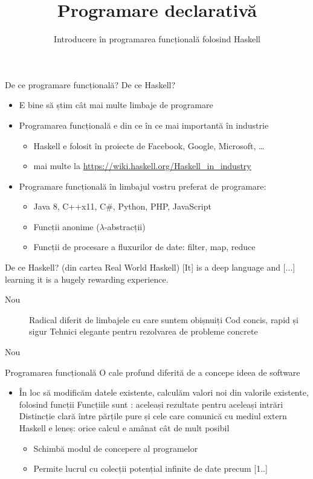 \documentclass[handout,xcolor=pdftex,romanian,colorlinks]{beamer}
\title[PD---Introducere]{Programare declarativă}
\subtitle{Introducere în programarea funcțională folosind Haskell}
\begin{document}
\begin{frame}
  \titlepage
\end{frame}

\begin{frame}{De ce programare funcțională? De ce Haskell?}
\begin{itemize}
\item E bine să știm cât mai multe limbaje de programare
\item Programarea funcțională e din ce în ce mai importantă în industrie
\begin{itemize}
\item Haskell e folosit în proiecte de Facebook, Google, Microsoft, \ldots
\item mai multe la \url{https://wiki.haskell.org/Haskell_in_industry}
\end{itemize} 
\item Programare funcțională în limbajul vostru preferat de programare:

\begin{itemize}
\item  Java 8, C++x11, C\#, Python, PHP, JavaScript 
\item Funcții anonime ($\lambda$-abstracții)
\item Funcții de procesare a fluxurilor de date: filter, map, reduce
\end{itemize}
\end{itemize}

\begin{block}{De ce Haskell? (din cartea Real World Haskell)}
 [It] is a deep language and [...] learning it is a hugely rewarding experience.
\end{block}
\begin{description}
\item[Nou] Radical diferit de limbajele cu care suntem obișnuiți
\vitem[Puternic] Cod concis, rapid și sigur
\vitem[Plăcut] Tehnici elegante pentru rezolvarea de probleme concrete
\end{description}
\end{frame}

\begin{frame}{Nou}
\begin{block}{Programarea funcțională}
O cale profund diferită de a concepe ideea de software
\end{block}
\begin{itemize}
\item În loc să modificăm datele existente, calculăm valori noi din valorile existente, folosind funcții
\vitem Funcțiile sunt : aceleași rezultate pentru aceleași intrări
\vitem Distincție clară între părțile pure și cele care comunică cu mediul extern
\vitem Haskell e leneș: orice calcul e amânat cât de mult posibil
\begin{itemize}
\item Schimbă modul de concepere al programelor
\item Permite lucrul cu colecții potențial infinite de date precum [1..]
\end{itemize}
\end{itemize}
\end{frame}
\end{document}

